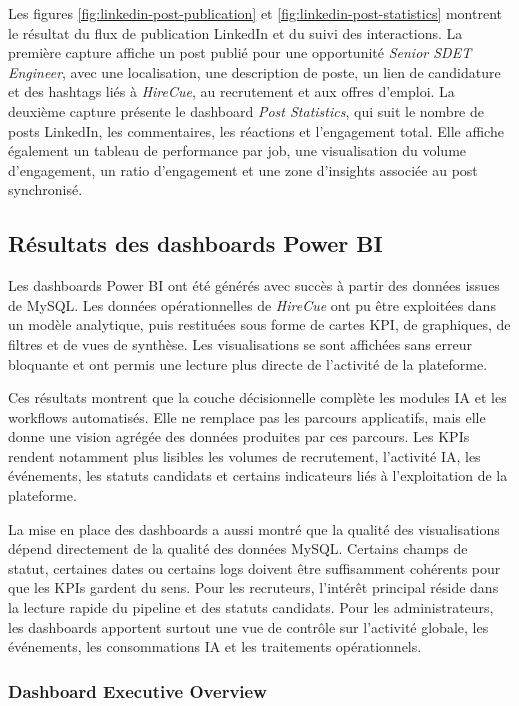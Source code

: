 Les figures \ref{fig:linkedin-post-publication} et \ref{fig:linkedin-post-statistics} montrent le résultat du flux de publication LinkedIn et du suivi des interactions. La première capture affiche un post publié pour une opportunité \textit{Senior SDET Engineer}, avec une localisation, une description de poste, un lien de candidature et des hashtags liés à \textit{HireCue}, au recrutement et aux offres d'emploi. La deuxième capture présente le dashboard \textit{Post Statistics}, qui suit le nombre de posts LinkedIn, les commentaires, les réactions et l'engagement total. Elle affiche également un tableau de performance par job, une visualisation du volume d'engagement, un ratio d'engagement et une zone d'insights associée au post synchronisé.

\subsection{Résultats des dashboards Power BI}

Les dashboards Power BI ont été générés avec succès à partir des données issues de MySQL. Les données opérationnelles de \textit{HireCue} ont pu être exploitées dans un modèle analytique, puis restituées sous forme de cartes KPI, de graphiques, de filtres et de vues de synthèse. Les visualisations se sont affichées sans erreur bloquante et ont permis une lecture plus directe de l'activité de la plateforme.

Ces résultats montrent que la couche décisionnelle complète les modules IA et les workflows automatisés. Elle ne remplace pas les parcours applicatifs, mais elle donne une vision agrégée des données produites par ces parcours. Les KPIs rendent notamment plus lisibles les volumes de recrutement, l'activité IA, les événements, les statuts candidats et certains indicateurs liés à l'exploitation de la plateforme.

La mise en place des dashboards a aussi montré que la qualité des visualisations dépend directement de la qualité des données MySQL. Certains champs de statut, certaines dates ou certains logs doivent être suffisamment cohérents pour que les KPIs gardent du sens. Pour les recruteurs, l'intérêt principal réside dans la lecture rapide du pipeline et des statuts candidats. Pour les administrateurs, les dashboards apportent surtout une vue de contrôle sur l'activité globale, les événements, les consommations IA et les traitements opérationnels.

\subsubsection{Dashboard Executive Overview}

